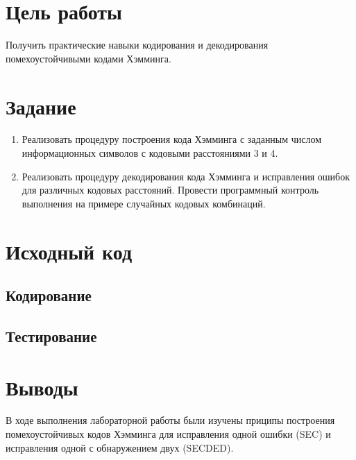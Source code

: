 \documentclass[listings]{labreport}
\begin{document}
\maketitlepage

\section*{Цель работы}

Получить практические навыки кодирования и декодирования
помехоустойчивыми кодами Хэмминга.

\section*{Задание}

\begin{enumerate}
\item Реализовать процедуру построения кода Хэмминга с заданным
  числом информационных символов с кодовыми расстояниями 3 и 4.
\item Реализовать процедуру декодирования кода Хэмминга и
  исправления ошибок для различных кодовых расстояний. Провести
  программный контроль выполнения на примере случайных кодовых
  комбинаций.
\end{enumerate}

\section*{Исходный код}

\subsection*{Кодирование}



\subsection*{Тестирование}



\section*{Выводы}

В ходе выполнения лабораторной работы были изучены приципы построения
помехоустойчивых кодов Хэмминга для исправления одной ошибки (SEC) и
исправления одной с обнаружением двух (SECDED).
\end{document}
